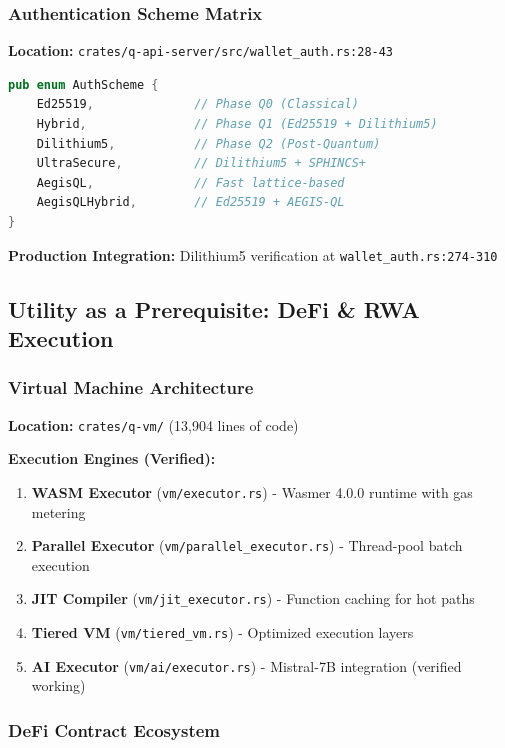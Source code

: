 \documentclass[11pt,a4paper]{article}
\begin{document}
\subsubsection{Authentication Scheme Matrix}

\textbf{Location:} \texttt{crates/q-api-server/src/wallet\_auth.rs:28-43}

\begin{lstlisting}[language=Rust,caption={Multi-Phase Authentication}]
pub enum AuthScheme {
    Ed25519,              // Phase Q0 (Classical)
    Hybrid,               // Phase Q1 (Ed25519 + Dilithium5)
    Dilithium5,           // Phase Q2 (Post-Quantum)
    UltraSecure,          // Dilithium5 + SPHINCS+
    AegisQL,              // Fast lattice-based
    AegisQLHybrid,        // Ed25519 + AEGIS-QL
}
\end{lstlisting}

\textbf{Production Integration:} Dilithium5 verification at \texttt{wallet\_auth.rs:274-310}

\subsection{Utility as a Prerequisite: DeFi \& RWA Execution}

\subsubsection{Virtual Machine Architecture}

\textbf{Location:} \texttt{crates/q-vm/} (13,904 lines of code)

\textbf{Execution Engines (Verified):}
\begin{enumerate}
    \item \textbf{WASM Executor} (\texttt{vm/executor.rs}) - Wasmer 4.0.0 runtime with gas metering
    \item \textbf{Parallel Executor} (\texttt{vm/parallel\_executor.rs}) - Thread-pool batch execution
    \item \textbf{JIT Compiler} (\texttt{vm/jit\_executor.rs}) - Function caching for hot paths
    \item \textbf{Tiered VM} (\texttt{vm/tiered\_vm.rs}) - Optimized execution layers
    \item \textbf{AI Executor} (\texttt{vm/ai/executor.rs}) - Mistral-7B integration (verified working)
\end{enumerate}

\subsubsection{DeFi Contract Ecosystem}
\end{document}
